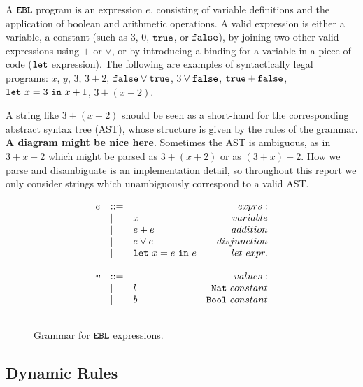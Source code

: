 A $\mathtt{EBL}$ program is an expression $e$, consisting of variable definitions and the application of boolean and arithmetic operations. A valid expression is either a variable, a constant (such as $3$, $0$, $\mathtt{true}$, or $\mathtt{false}$), by joining two other valid expressions using $+$ or $\lor$, or by introducing a binding for a variable in a piece of code ($\mathtt{let}$ expression). The following are examples of syntactically legal programs: $x$, $y$, $3$, $3+2$, $\mathtt{false} \lor \mathtt{true}$, $3 \lor \mathtt{false}$, $\mathtt{true} + \mathtt{false}$, $\mathtt{let}~ x = 3~\mathtt{in}~ x+1$, $3+(x+2)$.

A string like $3 + (x + 2)$ should be seen as a short-hand for the corresponding abstract syntax tree (AST), whose structure is given by the rules of the grammar. \textbf{A diagram might be nice here}. Sometimes the AST is ambiguous, as in $3 + x + 2$ which might be parsed as $3 + (x + 2)$ or as $(3 + x) + 2$. How we parse and disambiguate is an implementation detail, so throughout this report we only consider strings which unambiguously correspond to a valid AST.\\

\begin{figure}[h]

\[
\begin{array}{c}

\begin{array}{lllr}

e & ::= & ~ & exprs: \\
	& | & x & variable \\
	& | & e + e & addition \\
	& | & e \lor e & disjunction \\
	& | & \mathtt{let}~ x = e~\mathtt{in}~ e & let~expr. \\
	&&\\
	
v & ::= & ~ & values: \\
	& | & l & \mathtt{Nat}~constant \\
	& | & b & \mathtt{Bool}~constant \\
	&&\\

\end{array}

\end{array}
\]

\vspace{-12pt}
\caption{Grammar for $\mathtt{EBL}$ expressions.}
\label{A sample. }
\end{figure}


\subsection{Dynamic Rules}

